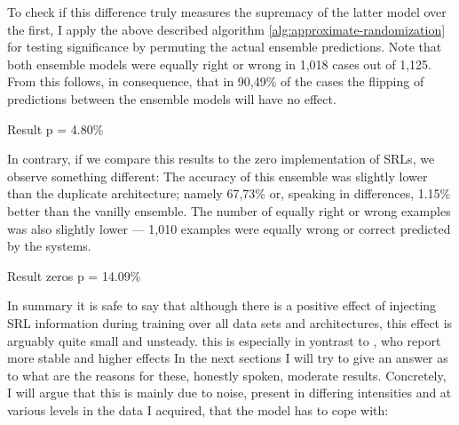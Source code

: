 To check if this difference truly measures the supremacy of the latter model over the first, I
apply the above described algorithm \ref{alg:approximate-randomization} for testing significance
by permuting the actual ensemble predictions. Note that both ensemble models were equally
right or wrong in 1,018 cases out of 1,125.  From this follows, in consequence, that in 90,49\%
of the cases the flipping of predictions between the ensemble models will have no effect.

Result p = 4.80\%

In contrary, if we compare this results to the zero implementation of SRLs, we observe something
different: The accuracy of this ensemble was slightly lower than the duplicate architecture;
namely 67,73\% or, speaking in differences, 1.15\% better than the vanilly ensemble. The
number of equally right or wrong examples was also slightly lower --- 1,010 examples were
equally wrong or correct predicted by the systems.

Result zeros p = 14.09\%

In summary it is safe to say that although there is a positive effect of injecting
SRL information during training over all data sets and architectures, this effect is
arguably quite small and unsteady. {\color{red} this is especially in yontrast to
\cite{zhang2019semantics}, who report more stable and higher effects} In the next
sections I will try to give an answer as to what are the reasons for these, honestly
spoken, moderate results. Concretely, I will argue that this is mainly due to noise,
present in differing intensities and at various levels in the data I acquired, that
the model has to cope with:




